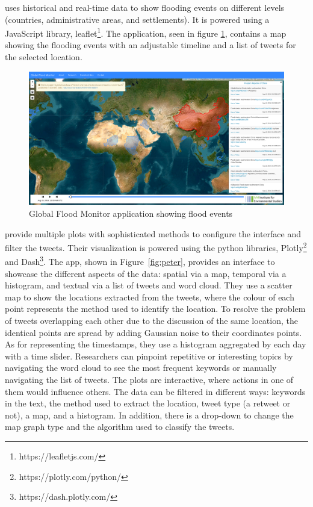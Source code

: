 uses historical and real-time data to show flooding
events on different levels (countries, administrative areas, and settlements). It is powered using a
JavaScript library, leaflet\footnote{https://leafletjs.com/}. The application, seen in figure
\ref{fig:global}, contains a map showing the flooding events with an adjustable timeline and a list
of tweets for the selected location.


\begin{figure}[H]
\begin{center}
  \includegraphics[width=\columnwidth]{images/global.png}
\end{center}
\caption{Global Flood Monitor application showing flood events}
\label{fig:global}
\end{figure}

 provide multiple plots with sophisticated
methods to configure the interface and filter the tweets. Their visualization is powered using the python
libraries, Plotly\footnote{https://plotly.com/python/} and Dash\footnote{https://dash.plotly.com/}.
The app, shown in Figure~\ref{fig:peter}, provides an interface to showcase the different aspects of the
data: spatial via a map, temporal via a histogram, and textual via a list of tweets and word cloud.
They use a scatter map to show the locations extracted from the tweets, where the colour of each
point represents the method used to identify the location. To resolve the problem of tweets
overlapping each other due to the discussion of the same location, the identical points are
spread by adding Gaussian noise to their coordinates points. As for representing the timestamps,
they use a histogram aggregated by each day with a time slider. Researchers can pinpoint repetitive
or interesting topics by navigating the word cloud to see the most frequent keywords or manually
navigating the list of tweets. The plots are interactive, where actions in one of them would
influence others. The data can be filtered in different ways: keywords in the text, the method used
to extract the location, tweet type (a retweet or not), a map, and a histogram. In addition, there is a
drop-down to change the map graph type and the algorithm used to classify the tweets.

